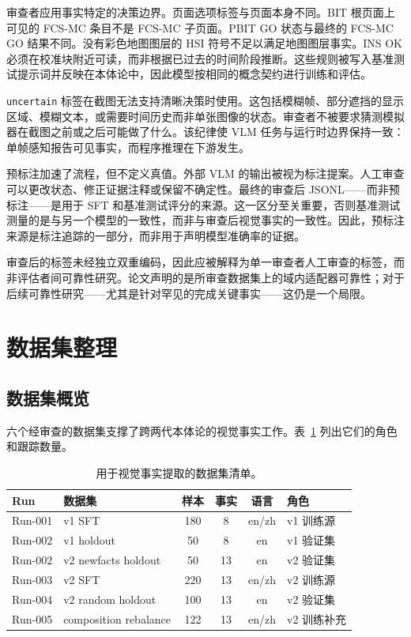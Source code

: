 审查者应用事实特定的决策边界。页面选项标签与页面本身不同。BIT 根页面上可见的 FCS-MC 条目不是 FCS-MC 子页面。PBIT GO 状态与最终的 FCS-MC GO 结果不同。没有彩色地图图层的 HSI 符号不足以满足地图图层事实。INS OK 必须在校准块附近可读，而非根据已过去的时间阶段推断。这些规则被写入基准测试提示词并反映在本体论中，因此模型按相同的概念契约进行训练和评估。

\texttt{uncertain} 标签在截图无法支持清晰决策时使用。这包括模糊帧、部分遮挡的显示区域、模糊文本，或需要时间历史而非单张图像的状态。审查者不被要求猜测模拟器在截图之前或之后可能做了什么。该纪律使 VLM 任务与运行时边界保持一致：单帧感知报告可见事实，而程序推理在下游发生。

预标注加速了流程，但不定义真值。外部 VLM 的输出被视为标注提案。人工审查可以更改状态、修正证据注释或保留不确定性。最终的审查后 JSONL——而非预标注——是用于 SFT 和基准测试评分的来源。这一区分至关重要，否则基准测试测量的是与另一个模型的一致性，而非与审查后视觉事实的一致性。因此，预标注来源是标注追踪的一部分，而非用于声明模型准确率的证据。

审查后的标签未经独立双重编码，因此应被解释为单一审查者人工审查的标签，而非评估者间可靠性研究。论文声明的是所审查数据集上的域内适配器可靠性；对于后续可靠性研究——尤其是针对罕见的完成关键事实——这仍是一个局限。

\section{数据集整理}\label{sec:method-datasets}

\subsection{数据集概览}

六个经审查的数据集支撑了跨两代本体论的视觉事实工作。表~\ref{tab:datasets} 列出它们的角色和跟踪数量。

\begin{table}[htbp]
  \centering
  \caption{用于视觉事实提取的数据集清单。}
  \label{tab:datasets}
  \small
  \begin{tabularx}{\textwidth}{@{}lXcccX@{}}
  \toprule
  \textbf{Run} & \textbf{数据集} & \textbf{样本} & \textbf{事实} & \textbf{语言} & \textbf{角色} \\
  \midrule
  Run-001 & v1 SFT & 180 & 8 & en/zh & v1 训练源 \\
  Run-002 & v1 holdout & 50 & 8 & en & v1 验证集 \\
  Run-002 & v2 newfacts holdout & 50 & 13 & en & v2 验证集 \\
  Run-003 & v2 SFT & 220 & 13 & en/zh & v2 训练源 \\
  Run-004 & v2 random holdout & 100 & 13 & en & v2 验证集 \\
  Run-005 & composition rebalance & 122 & 13 & en/zh & v2 训练补充 \\
  \bottomrule
  \end{tabularx}
\end{table}

